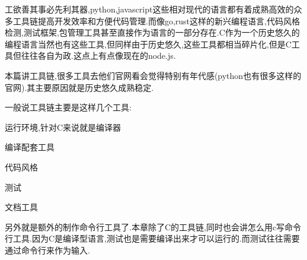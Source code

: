 工欲善其事必先利其器,python,javascript这些相对现代的语言都有着成熟高效的众多工具链提高开发效率和方便代码管理.\+而像go,rust这样的新兴编程语言,代码风格检测,测试框架,包管理工具甚至直接作为语言的一部分存在.\+C作为一个历史悠久的编程语言当然也有这些工具,但同样由于历史悠久,这些工具都相当碎片化,但是\+C工具但往往各自为政.\+这点上有点像现在的node.\+js.

本篇讲工具链,很多工具去他们官网看会觉得特别有年代感(python也有很多这样的官网).其主要原因就是历史悠久成熟稳定.

一般说工具链主要是这样几个工具\+:


\begin{DoxyItemize}
\item 运行环境,针对\+C来说就是编译器
\item 编译配套工具
\item 代码风格
\item 测试
\item 文档工具
\end{DoxyItemize}

另外就是额外的制作命令行工具了.\+本章除了\+C的工具链,同时也会讲怎么用c写命令行工具.\+因为\+C是编译型语言,测试也是需要编译出来才可以运行的.\+而测试往往需要通过命令行来作为输入. 